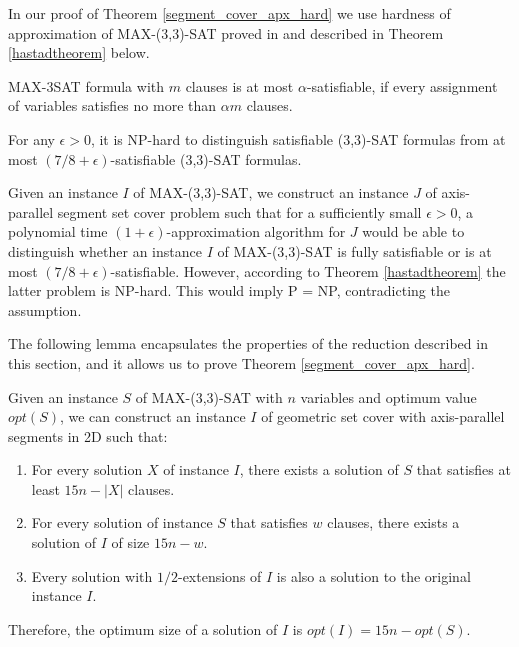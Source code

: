 In our proof of Theorem \ref{segment_cover_apx_hard} we use
hardness of approximation of MAX-(3,3)-SAT proved
in \cite{hastad} and described in
Theorem \ref{hastadtheorem} below.

\begin{defi}
MAX-3SAT formula with $m$ clauses is at most $\alpha$-satisfiable, if
every assignment of variables satisfies no more than $\alpha m$
clauses. 
\end{defi}

\begin{tw}{
	\label{hastadtheorem}
	\textbf{\cite{hastad}}
	For any $\epsilon > 0$, it is NP-hard to distinguish satisfiable
	\linebreak
	(3,3)-SAT formulas from
	at most
	\mbox{$(7/8 + \epsilon)$-satisfiable}
	(3,3)-SAT formulas.
}\end{tw}


Given an instance $I$ of MAX-(3,3)-SAT,
we construct an instance $J$ of 
axis-parallel segment set cover problem
such that for a sufficiently small $\epsilon > 0$,
a polynomial time $(1+\epsilon)$-approximation algorithm for $J$
would be able to distinguish  whether an instance $I$ of MAX-(3,3)-SAT
is fully satisfiable
or is at most $(7/8 + \epsilon)$-satisfiable.
However, according to Theorem \ref{hastadtheorem} the latter problem
is NP-hard.
This would imply P = NP, contradicting the assumption.

The following lemma encapsulates the properties
of the reduction described in this section,
and it allows us to prove Theorem \ref{segment_cover_apx_hard}.

\begin{lemma}{
	\label{apxconstruction}
	Given an instance $S$ of  MAX-(3,3)-SAT 
	with $n$ variables and optimum value $opt(S)$,
	we can construct an instance $I$ of geometric set cover with
	axis-parallel segments in 2D such that:
	\begin{enumerate}[label={(\arabic*)}]
	\item For every solution $X$ of instance $I$,
	there exists a solution of $S$ that satisfies at least  $15n - |X|$
	clauses.
	
	\item For every solution of instance $S$ that satisfies $w$ clauses,
	there exists a solution of $I$ of size $15n - w$.
	
	\item \label{lemma:apxconstruction:enumerate:extensions}
	Every solution with $1/2$-extensions of $I$
	is also a solution to the original instance $I$.
\end{enumerate}
Therefore, the optimum size of a solution of $I$
is $opt(I) = 15n - opt(S)$. 
	
}\end{lemma}

